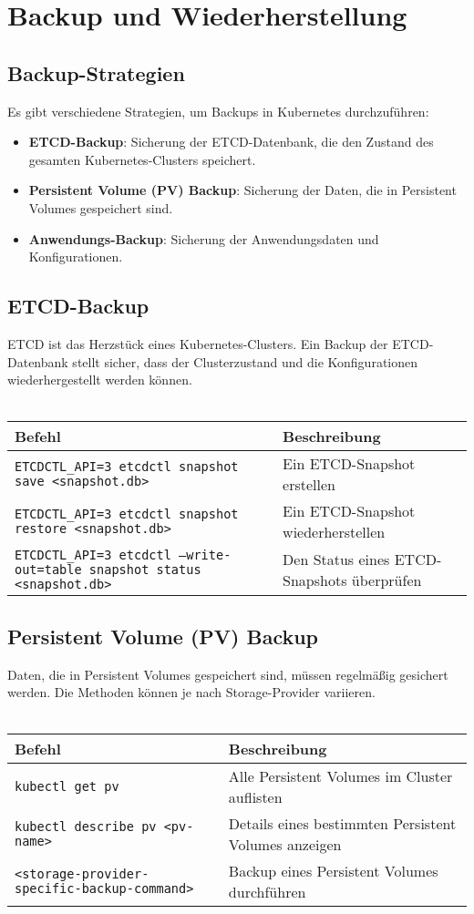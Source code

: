 \chapter{Backup und Wiederherstellung}

\section{Backup-Strategien}
Es gibt verschiedene Strategien, um Backups in Kubernetes durchzuführen:
\begin{itemize}
    \item \textbf{ETCD-Backup}: Sicherung der ETCD-Datenbank, die den Zustand des gesamten Kubernetes-Clusters speichert.
    \item \textbf{Persistent Volume (PV) Backup}: Sicherung der Daten, die in Persistent Volumes gespeichert sind.
    \item \textbf{Anwendungs-Backup}: Sicherung der Anwendungsdaten und Konfigurationen.
\end{itemize}

\section{ETCD-Backup}
ETCD ist das Herzstück eines Kubernetes-Clusters. Ein Backup der ETCD-Datenbank stellt sicher, dass der Clusterzustand und die Konfigurationen wiederhergestellt werden können.\\
\phantom{.}\\
\begin{tabular}{|p{}|p{}|}
\hline
\textbf{Befehl} & \textbf{Beschreibung} \\
\hline
\texttt{ETCDCTL\_API=3 etcdctl snapshot save <snapshot.db>} & Ein ETCD-Snapshot erstellen \\
\texttt{ETCDCTL\_API=3 etcdctl snapshot restore <snapshot.db>} & Ein ETCD-Snapshot wiederherstellen \\
\texttt{ETCDCTL\_API=3 etcdctl --write-out=table snapshot status <snapshot.db>} & Den Status eines ETCD-Snapshots überprüfen \\
\hline
\end{tabular}

\section{Persistent Volume (PV) Backup}
Daten, die in Persistent Volumes gespeichert sind, müssen regelmäßig gesichert werden. Die Methoden können je nach Storage-Provider variieren.\\
\phantom{.}\\
\begin{tabular}{|l|l|}
\hline
\textbf{Befehl} & \textbf{Beschreibung} \\
\hline
\texttt{kubectl get pv} & Alle Persistent Volumes im Cluster auflisten \\
\texttt{kubectl describe pv <pv-name>} & Details eines bestimmten Persistent Volumes anzeigen \\
\texttt{<storage-provider-specific-backup-command>} & Backup eines Persistent Volumes durchführen \\
\hline
\end{tabular}

